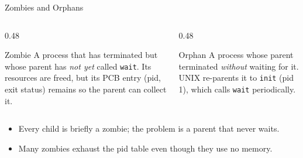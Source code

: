 \documentclass[aspectratio=169]{beamer}
\begin{document}
\begin{frame}{Zombies and Orphans}
  \begin{columns}[T]
    \begin{column}{0.48\textwidth}
      \begin{block}{Zombie}
        A process that has terminated but whose parent has \emph{not yet}
        called \texttt{wait}. Its resources are freed, but its PCB entry
        (pid, exit status) remains so the parent can collect it.
      \end{block}
    \end{column}
    \begin{column}{0.48\textwidth}
      \begin{block}{Orphan}
        A process whose parent terminated \emph{without} waiting for it. UNIX
        re-parents it to \texttt{init} (pid 1), which calls \texttt{wait}
        periodically.
      \end{block}
    \end{column}
  \end{columns}
  \vspace{0.3cm}
  \begin{itemize}
    \item Every child is briefly a zombie; the problem is a parent that never
      waits.
    \item Many zombies exhaust the pid table even though they use no memory.
  \end{itemize}
\end{frame}
\end{document}

